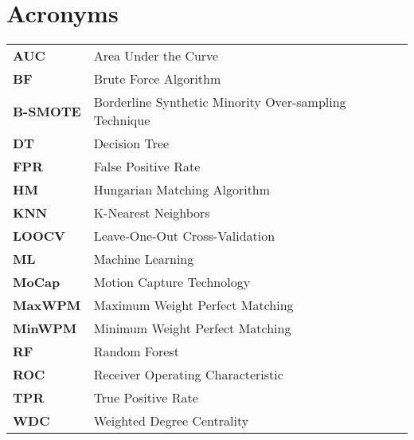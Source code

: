 \section*{\Huge Acronyms}

\begin{table}[H]
    \begin{tabular}{l l} 
        \textbf{AUC} & Area Under the Curve \\
        \textbf{BF} & Brute Force Algorithm \\
        \textbf{B-SMOTE} & Borderline Synthetic Minority Over-sampling Technique \\
        \textbf{DT} & Decision Tree \\
        \textbf{FPR} & False Positive Rate \\
        \textbf{HM} & Hungarian Matching Algorithm \\
        \textbf{KNN} & K-Nearest Neighbors \\
        \textbf{LOOCV} & Leave-One-Out Cross-Validation \\
        \textbf{ML} & Machine Learning \\
        \textbf{MoCap} & Motion Capture Technology \\
        \textbf{MaxWPM} & Maximum Weight Perfect Matching \\
        \textbf{MinWPM} & Minimum Weight Perfect Matching \\
        \textbf{RF} & Random Forest \\
        \textbf{ROC} & Receiver Operating Characteristic \\
        \textbf{TPR} & True Positive Rate \\
        \textbf{WDC} & Weighted Degree Centrality \\
    \end{tabular}
\end{table}

